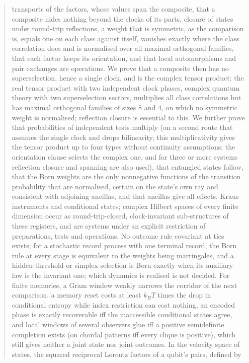 \documentclass[aps,pra,onecolumn,superscriptaddress,nofootinbib,10pt]{revtex4-2}
\theoremstyle{definition}
\theoremstyle{remark}
\begin{document}
\begin{abstract}
transports of the factors, whose values span the composite, that a composite hides nothing beyond the
clocks of its parts, closure of states under round-trip reflections, a weight that is symmetric, as the
comparison is, equals one on each class against itself, vanishes exactly where the class correlation
does and is normalised over all maximal orthogonal families, that each factor keeps its orientation, and that
local automorphisms and pair exchanges are operations.  We prove that a composite then has no
superselection, hence a single clock, and is the complex tensor product: the real tensor product with
two independent clock phases, complex quantum theory with two superselection sectors, multiplies all
class correlations but has maximal orthogonal families of sizes $8$ and $4$, on which no symmetric
weight is normalised; reflection closure is essential to this.  We further prove that probabilities of independent tests multiply
(on a second route that assumes the single clock and drops bilinearity, this multiplicativity gives the
tensor product up to four types without continuity assumptions; the orientation clause selects the
complex one, and for three or more systems reflection closure and spanning are also used), that
entangled states follow, that
the Born weights are the only nonnegative functions of the transition probability that are normalised,
certain on the state's own ray and consistent with adjoining ancillas, and that ancillas give all effects, Kraus instruments and conditional states; complex Hilbert spaces
of every finite dimension occur as round-trip-closed, clock-invariant sub-structures of these registers,
and are systems under an explicit restriction of preparations, tests and operations.  No
outcome rule covariant at ties exists; for a stochastic record process with one terminal record, the Born rule
at every stage is equivalent to the weights being martingales, and a hidden-threshold or simplex
selection is Born exactly when its auxiliary law is the invariant one; which dynamics is realised is
not decided.  For finite memories, a Gram window weakly narrows the corridor of the next comparison, a
memory reset costs at least $k_BT$ times the drop in conditional entropy while index restriction can cost
nothing, an encoded phase is exactly recoverable iff the inaccessible conditional states agree, and
local windows of several observers glue iff a positive semidefinite completion exists (on chordal
patterns iff every clique is positive), which still gives neither a joint state nor joint outcomes.
In the velocity space of states, the squared reciprocal Lorentz factors of a qubit's pairs, defined by

\end{abstract}
\end{document}
